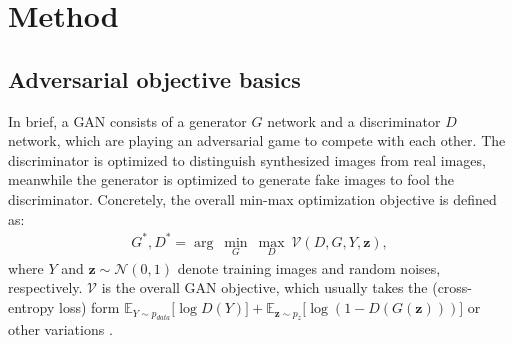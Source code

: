 \documentclass[10pt,twocolumn,letterpaper]{article}
\begin{document}
\section{Method}

\subsection{Adversarial objective basics}
In brief, a GAN \cite{goodfellow2014generative} consists of a generator $G$ network and a discriminator $D$ network, which are playing an adversarial game to compete with each other. The discriminator is optimized to distinguish synthesized images from real images, meanwhile the generator is optimized to generate fake images to fool the discriminator. Concretely, the overall min-max optimization objective is defined as: 
\begin{equation}
\label{equ:GAN}
\begin{split}
G^*, D^* = \arg~\underset{G}{\min}\ \underset{D}{\max}~ \mathcal{V}(D, G, Y, \bm z),
\end{split}
\end{equation}
where $Y$ and $\bm z \sim \mathcal{N}(0,1)$ denote training images and random noises, respectively. 
$\mathcal{V}$ is the overall GAN objective, which usually takes the (cross-entropy loss) form $\mathbb{E}_{Y\sim p_{data}}\big[\log D(Y)\big] + \mathbb{E}_{\bm z\sim p_{z}}\big[\log (1-D(G(\bm z)))\big]$ or other variations \cite{lsgan,berthelot2017began}.

\end{document}

